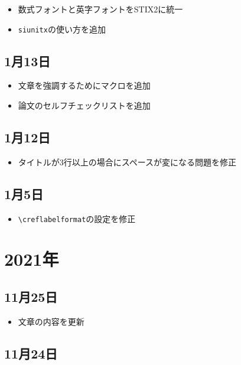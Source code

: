 \begin{itemize}
  \item 数式フォントと英字フォントをSTIX2に統一
  \item \texttt{siunitx}の使い方を追加
\end{itemize}

\subsection*{1月13日}

\begin{itemize}
  \item 文章を強調するためにマクロを追加
  \item 論文のセルフチェックリストを追加
\end{itemize}

\subsection*{1月12日}

\begin{itemize}
  \item タイトルが3行以上の場合にスペースが変になる問題を修正
\end{itemize}

\subsection*{1月5日}

\begin{itemize}
  \item \texttt{\textbackslash creflabelformat}の設定を修正
\end{itemize}

\section*{2021年}

\subsection*{11月25日}

\begin{itemize}
  \item 文章の内容を更新
\end{itemize}

\subsection*{11月24日}


